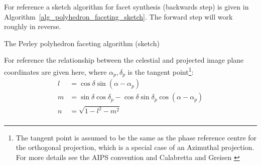 For reference a sketch algorithm for facet synthesis (backwards step) is given in Algorithm~\ref{alg_polyhedron_faceting_sketch}. The forward
step will work roughly in reverse.
\begin{algorithm}
  \begin{algorithmic}
    \ENDFOR
  \ENDFOR
  \end{algorithmic}
  \caption{The Perley polyhedron faceting algorithm (sketch)}
  \label{alg_polyhedron_faceting_sketch}
\end{algorithm}

For reference the relationship between the celestial and projected image plane coordinates are given here, where
$\alpha_p,\delta_p$ is the tangent point\footnote{The tangent point is assumed to be the same as the phase reference 
centre for the orthogonal projection, which is a special case of an Azimuthal projection. For more details see the 
AIPS convention \cite{aipsnonlinearcoords} and Calabretta and Greisen \cite{calabretta2002representations}}:
\begin{equation}
 \begin{split}
  l &= \cos{\delta}\sin{(\alpha-\alpha_p)}\\
  m &= \sin{\delta}\cos{\delta_p}-\cos{\delta}\sin{\delta_p}\cos{(\alpha-\alpha_p)}\\
  n &= \sqrt{1-l^2-m^2}\\
 \end{split}
\end{equation}

